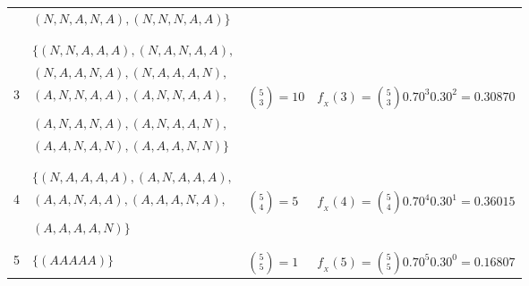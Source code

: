 \documentclass[base=hide,12pt]{elegantbook}
\begin{document}
\begin{itemize}
\begin{center}
{\begin{tabular}{cp{6cm}p{2.5cm}c}
				& $(N,N,A,N,A),(N,N,N,A,A)\}$  & 	                 & \\
				&&&\\ 
				&&&\\
				& $\{(N,N,A,A,A),(N,A,N,A,A),$&                   & \\
				& $(N,A,A,N,A),(N,A,A,A,N),$&                   & \\
				3 & $(A,N,N,A,A),(A,N,N,A,A),$& $\displaystyle\binom{5}{3}=10$ & $f_{_X}(3)=\displaystyle\binom{5}{3} 0.70^{3} 0.30^{2}=0.30870$\\
				& $(A,N,A,N,A),(A,N,A,A,N),$&                   & \\
				& $(A,A,N,A,N),(A,A,A,N,N)\}$&                   & \\
				&&&\\ 
				&&&\\
				&$\{(N,A,A,A,A),(A,N,A,A,A),$& & \\
				4 &$(A,A,N,A,A),(A,A,A,N,A),$  & $\displaystyle\binom{5}{4}=5$ & $f_{_X}(4)=\displaystyle\binom{5}{4} 0.70^{4} 0.30^{1} =0.36015$\\
				&$(A,A,A,A,N)\}$             & & \\
				
				&&&\\ 
				&&&\\
				5 &$\{(AAAAA)\}$ & $\displaystyle\binom{5}{5}=1$ &  $f_{_X}(5)=\displaystyle\binom{5}{5} 0.70^{5} 0.30^{0}=0.16807$ \\
				

\end{tabular}}
\end{center}
\end{itemize}
\end{document}
